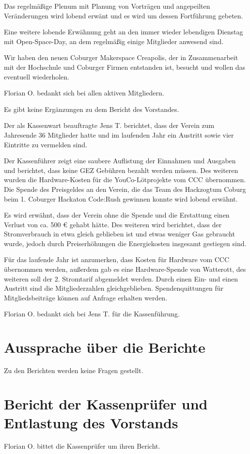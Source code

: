 Das regelmäßige Plenum mit Planung von Vorträgen und angepeilten Veränderungen wird lobend erwänt und es wird um dessen Fortführung gebeten.

Eine weitere lobende Erwähnung geht an den immer wieder lebendigen Dienstag mit Open-Space-Day, an dem regelmäßig einige Mitglieder anwesend sind.

Wir haben den neuen Coburger Makerspace Creapolis, der in Zusammenarbeit mit der Hochschule und Coburger Firmen entstanden ist, besucht und wollen das eventuell wiederholen.

Florian O. bedankt sich bei allen aktiven Mitgliedern.

Es gibt keine Ergänzungen zu dem Bericht des Vorstandes.

Der als Kassenwart beauftragte Jens T. berichtet, dass der Verein zum Jahresende 36 Mitglieder hatte und im laufenden Jahr ein Austritt sowie vier Eintritte zu vermelden sind.

Der Kassenführer zeigt eine saubere Auflistung der Einnahmen und Ausgaben und berichtet, dass keine GEZ Gebühren bezahlt werden müssen.
Des weiteren wurden die Hardware-Kosten für die YouCo-Lötprojekte vom CCC übernommen.
Die Spende des Preisgeldes an den Verein, die das Team des Hackzogtum Coburg beim 1. Coburger Hackaton Code:Rush gewinnen konnte wird lobend erwähnt.

Es wird erwähnt, dass der Verein ohne die Spende und die Erstattung einen Verlust von ca. 500 € gehabt hätte.
Des weiteren wird berichtet, dass der Stromverbrauch in etwa gleich geblieben ist und etwas weniger Gas gebraucht wurde, jedoch durch Preiserhöhungen die Energiekosten insgesamt gestiegen sind.

Für das laufende Jahr ist anzumerken, dass Kosten für Hardware vom CCC übernommen werden, außerdem gab es eine Hardware-Spende von Watterott, des weiteren soll der 2. Stromtarif abgemeldet werden. Durch einen Ein- und einen Austritt sind die Mitgliederzahlen gleichgeblieben. Spendenquittungen für Mitgliedsbeiträge können auf Anfrage erhalten werden.

Florian O. bedankt sich bei Jens T. für die Kassenführung.



\section{Aussprache über die Berichte}
Zu den Berichten werden keine Fragen gestellt.

\section{Bericht der Kassenprüfer und Entlastung des Vorstands}
Florian O. bittet die Kassenprüfer um ihren Bericht.

